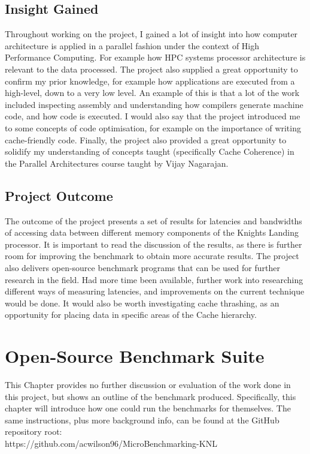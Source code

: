 \documentclass[bsc,frontabs,twoside,singlespacing,parskip,deptreport]{infthesis}     %
\begin{document}
\section{Insight Gained}
Throughout working on the project, I gained a lot of insight into how computer architecture is applied in a parallel fashion under the context of High Performance Computing. For example how HPC systems processor architecture is relevant to the data processed. The project also supplied a great opportunity to confirm my prior knowledge, for example how applications are executed from a high-level, down to a very low level. An example of this is that a lot of the work included inspecting assembly and understanding how compilers generate machine code, and how code is executed. I would also say that the project introduced me to some concepts of code optimisation, for example on the importance of writing cache-friendly code. Finally, the project also provided a great opportunity to solidify my understanding of concepts taught (specifically Cache Coherence) in the Parallel Architectures course taught by Vijay Nagarajan.

\section{Project Outcome}
The outcome of the project presents a set of results for latencies and bandwidths of accessing data between different memory components of the Knights Landing processor. It is important to read the discussion of the results, as there is further room for improving the benchmark to obtain more accurate results. The project also delivers open-source benchmark programs that can be used for further research in the field. Had more time been available, further work into researching different ways of measuring latencies, and improvements on the current technique would be done. It would also be worth investigating cache thrashing, as an opportunity for placing data in specific areas of the Cache hierarchy.

\chapter{Open-Source Benchmark Suite}\label{chap:benchmark-suite}
This Chapter provides no further discussion or evaluation of the work done in this project, but shows an outline of the benchmark produced. Specifically, this chapter will introduce how one could run the benchmarks for themselves. The same instructions, plus more background info, can be found at the GitHub repository root: \\
https://github.com/acwilson96/MicroBenchmarking-KNL
\end{document}
